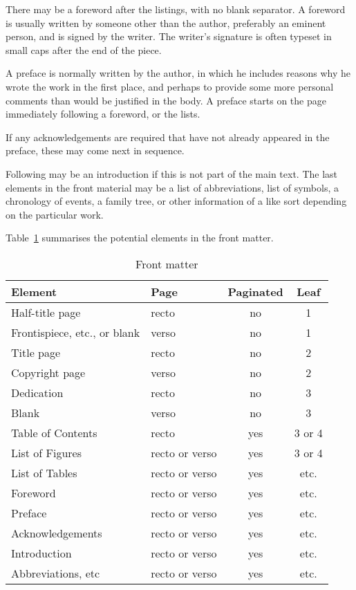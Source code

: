 \documentclass[10pt,letterpaper]{memoir}
\newcommand{\ixtoc}{\index{ToC}}     %
\newcommand{\ixlof}{\index{LoF}}
\newcommand{\ixlot}{\index{LoT}}
\begin{document}
    There may be a foreword after the listings, with no blank
separator. A foreword is usually written by someone other than the author, 
preferably an eminent person, and is signed by the writer. The writer's
signature is often typeset in small caps after the end of the piece.

   A preface is normally written by the author, in which he
includes reasons why he wrote the work in the first place, and perhaps to 
provide some more personal comments than would be justified in the body. 
A preface starts on the page immediately following a foreword, or the lists.

   If any acknowledgements are required that have not already appeared in the
preface, these may come next in sequence.

   Following may be an introduction if this is not part of the main text. 
The last elements in the front material may be a list of abbreviations, list
of symbols, a chronology of events, a family tree, or other information of
a like sort depending on the particular work.

    Table~\ref{tab:front} summarises the potential elements in the front
matter.

\begin{table}
\centering
\caption{Front matter}\label{tab:front}
\begin{tabular}{llcc} \hline
Element                      & Page  & Paginated & Leaf \\ \hline
Half-title page              & recto & no        & 1 \\
Frontispiece, etc., or blank & verso & no        & 1 \\
Title page                   & recto & no        & 2 \\
Copyright page               & verso & no        & 2 \\
Dedication                   & recto & no        & 3 \\
Blank                        & verso & no        & 3 \\
Table of Contents\ixtoc            & recto & yes       & 3 or 4 \\
List of Figures\ixlof     & recto or verso & yes       & 3 or 4 \\
List of Tables\ixlot      & recto or verso & yes       & etc. \\
Foreword            & recto or verso & yes       & etc. \\
Preface             & recto or verso & yes       & etc. \\
Acknowledgements    & recto or verso & yes       & etc. \\
Introduction        & recto or verso & yes       & etc. \\
Abbreviations, etc  & recto or verso & yes       & etc. \\
\hline
\end{tabular}
\end{table}
\end{document}
